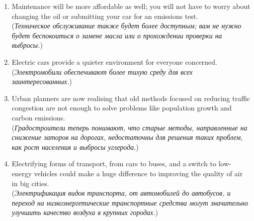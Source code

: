 \begin{enumerate}
      \item Maintenance will be more affordable as well; you will not have to worry about changing the oil or submitting your car for an emissions test.\\
            (\textit{Техническое обслуживание также будет более доступным; вам не нужно будет беспокоиться о замене масла или о прохождении проверки на выбросы.})

      \item Electric cars provide a quieter environment for everyone concerned.\\
            (\textit{Электромобили обеспечивают более тихую среду для всех заинтересованных.})

      \item Urban planners are now realising that old methods focused on reducing traffic congestion are not enough to solve problems like population growth and carbon emissions.\\
            (\textit{Градостроители теперь понимают, что старые методы, направленные на снижение заторов на дорогах, недостаточны для решения таких проблем, как рост населения и выбросы углерода.})

      \item Electrifying forms of transport, from cars to buses, and a switch to low-energy vehicles could make a huge difference to improving the quality of air in big cities.\\
            (\textit{Электрификация видов транспорта, от автомобилей до автобусов, и переход на низкоэнергетические транспортные средства могут значительно улучшить качество воздуха в крупных городах.})
\end{enumerate}

